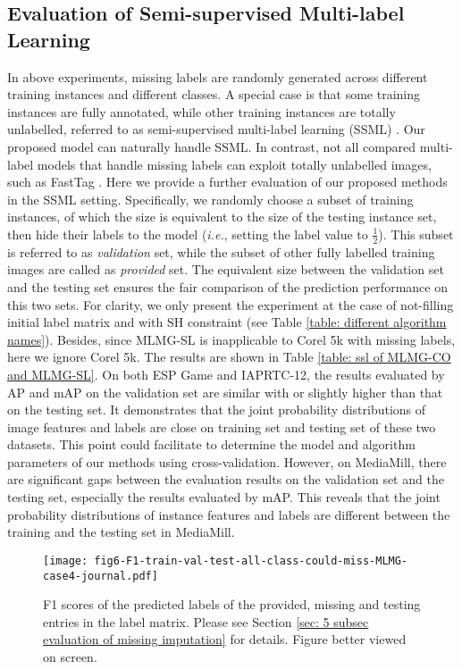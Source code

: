 \documentclass[twocolumn]{svjour3}          %
\begin{document}
\subsection{Evaluation of Semi-supervised Multi-label Learning}

In above experiments, missing labels are randomly generated across different training instances and different classes. A special case is that some training instances are fully annotated, while other training instances are totally unlabelled, referred to as semi-supervised multi-label learning (SSML) \cite{semi-multi-label-sdm-2008}. Our proposed model can naturally handle SSML. In contrast, not all compared multi-label models that handle missing labels can exploit totally unlabelled images, such as FastTag \cite{fasttag-icml-2013}. 
%
Here we provide a further evaluation of our proposed methods in the SSML setting. 
Specifically, we randomly choose a subset of training instances, of which the size is equivalent to the size of the testing instance set, then hide their labels to the model ({\it i.e.}, setting the label value to $\frac{1}{2}$). This subset is referred to as {\it validation} set, while the subset of other fully labelled training images are called as {\it provided} set. The equivalent size between the validation set and the testing set ensures the fair comparison of the prediction performance on this two sets. 
For clarity, we only present the experiment at the case of not-filling initial label matrix and with SH constraint (see Table \ref{table: different algorithm names}). Besides, since MLMG-SL is inapplicable to Corel 5k with missing labels, here we ignore Corel 5k. 
The results are shown in Table \ref{table: ssl of MLMG-CO and MLMG-SL}. 
On both ESP Game and IAPRTC-12, the results evaluated by AP and mAP on the validation set are similar with or slightly higher than that on the testing set. It demonstrates that the joint probability distributions of image features and labels are close on training set and testing set of these two datasets. This point could facilitate to determine the model and algorithm parameters of our methods using cross-validation. 
However, on MediaMill, there are significant gaps between the evaluation results on the validation set and the testing set, especially the results evaluated by mAP. 
This reveals that the joint probability distributions of instance features and labels are different between the training and the testing set in MediaMill. 



\begin{figure*}[!tbh]
\centering
\texttt{[image: fig6-F1-train-val-test-all-class-could-miss-MLMG-case4-journal.pdf]}
\caption{F1 scores of the predicted labels of the provided, missing and testing entries in the label matrix. Please see Section \ref{sec: 5 subsec evaluation of missing imputation} for details. Figure better viewed on screen.}
\label{fig: F1 on given, miss, test labels}
\end{figure*}
\end{document}
